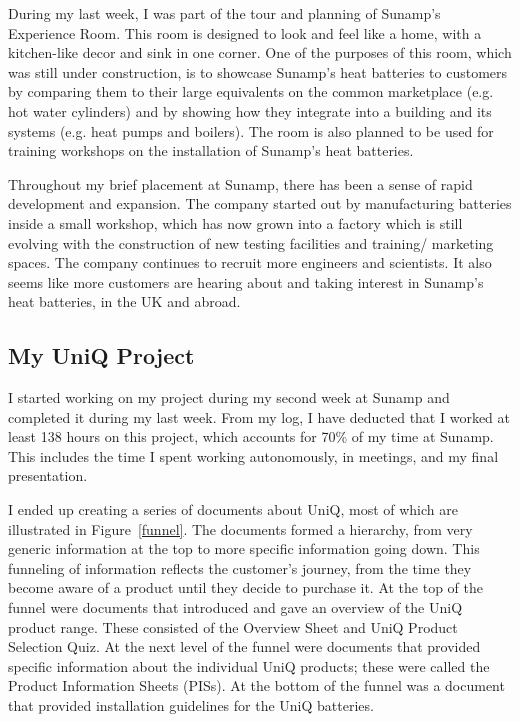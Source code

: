 During my last week, I was part of the tour and planning of Sunamp's Experience Room.
This room is designed to look and feel like a home, with a kitchen-like decor and sink in one corner.
One of the purposes of this room, which was still under construction, is to showcase Sunamp's heat batteries to customers by comparing them to their large equivalents on the common marketplace (e.g. hot water cylinders) and by showing how they integrate into a building and its systems (e.g. heat pumps
and boilers).
The room is also planned to be used for training workshops on the installation of Sunamp's heat batteries.

Throughout my brief placement at Sunamp, there has been a sense of rapid development and expansion.
The company started out by manufacturing batteries inside a small workshop, which has now grown into a factory which is still evolving with the construction of new testing facilities and training/ marketing spaces.
The company continues to recruit more engineers and scientists.
It also seems like more customers are hearing about and taking interest in Sunamp's heat batteries, in the UK and abroad.






\subsection{My UniQ Project} \label{sec:sunamp_work}



I started working on my project during my second week at Sunamp and completed it during my last week.
From my log, I have deducted that I worked at least 138 hours on this project, which accounts for 70\% of my time at Sunamp.
This includes the time I spent working autonomously, in meetings, and my final presentation.

I ended up creating a series of documents about UniQ, most of which are illustrated in Figure~\ref{funnel}.
The documents formed a hierarchy, from very generic information at the top to more specific information going down.
This funneling of information reflects the customer's journey, from the time they become aware of a product until they decide to purchase it.
At the top of the funnel were documents that introduced and gave an overview of the UniQ product range.
These consisted of the Overview Sheet and UniQ Product Selection Quiz.
At the next level of the funnel were documents that provided specific information about the individual UniQ products; these were called the Product Information Sheets (PISs).
At the bottom of the funnel was a document that provided installation guidelines for the UniQ batteries.


